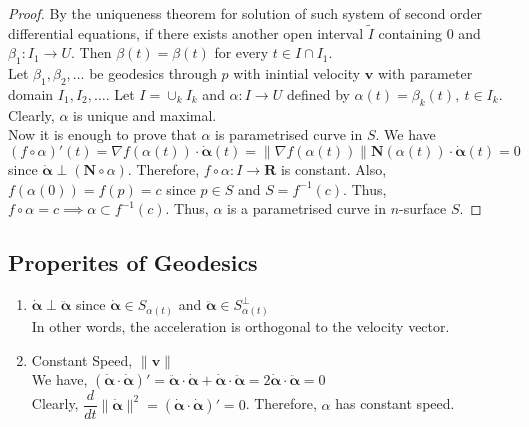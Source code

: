 \begin{proof}
	By the uniqueness theorem for solution of such system of second order differential equations, if there exists another open interval $\tilde{I}$ containing $0$ and $\beta_1 : I_1 \to U$.
	Then $\beta(t) = \beta(t)$ for every $t \in I \cap I_1$.\\


	Let $\beta_1,\beta_2,\dotsc$ be geodesics through $p$ with inintial velocity $\boldsymbol{v}$ with parameter domain $I_1,I_2,\dotsc$.
	Let $I = \cup_k I_k$ and $\alpha : I \to U$ defined by $\alpha(t) = \beta_k(t),\ t \in I_k$.
	Clearly, $\alpha$ is unique and maximal.\\


	Now it is enough to prove that $\alpha$ is parametrised curve in $S$.
	We have $(f \circ \alpha)'(t) = \nabla f(\alpha(t)) \cdot \dot{\boldsymbol{\alpha}}(t) = \| \nabla f(\alpha(t)) \| \boldsymbol{N}(\alpha(t)) \cdot \dot{\boldsymbol{\alpha}}(t) = 0$ since $\dot{\boldsymbol{\alpha}} \perp (\boldsymbol{N} \circ \alpha)$.
	Therefore, $f \circ \alpha : I \to \boldsymbol{R}$ is constant.
	Also, $f(\alpha(0)) = f(p) = c$ since $p \in S$ and $S = f^{-1}(c)$.
	Thus, $f \circ \alpha = c \implies \alpha \subset f^{-1}(c)$.
	Thus, $\alpha$ is a parametrised curve in $n$-surface $S$.
\end{proof}

\subsection{Properites of Geodesics}
\begin{enumerate}
	\item $\dot{\boldsymbol{\alpha}} \perp \ddot{\boldsymbol{\alpha}}$ since $\dot{\boldsymbol{\alpha}} \in S_{\alpha(t)}$ and $\ddot{\boldsymbol{\alpha}} \in S_{\alpha(t)}^\perp$\\
		In other words, the acceleration is orthogonal to the velocity vector.
	\item Constant Speed, $\| \boldsymbol{v} \|$\\
		We have, $(\dot{\boldsymbol{\alpha}} \cdot \dot{\boldsymbol{\alpha}})' =  \ddot{\boldsymbol{\alpha}} \cdot \dot{\boldsymbol{\alpha}} + \dot{\boldsymbol{\alpha}} \cdot \ddot{\boldsymbol{\alpha}} = 2\dot{\boldsymbol{\alpha}} \cdot \ddot{\boldsymbol{\alpha}} = 0$\\
		Clearly, $\dfrac{d}{dt} \|\dot{\boldsymbol{\alpha}} \|^2 =  \left( \dot{\boldsymbol{\alpha}} \cdot \dot{\boldsymbol{\alpha}} \right)' = 0$.
		Therefore, $\alpha$ has constant speed.
\end{enumerate} 

